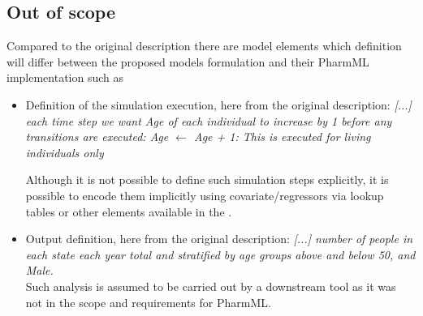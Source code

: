 \subsection*{Out of scope}
Compared to the original description there are model elements which 
definition will differ between the proposed models formulation and their  
PharmML implementation such as
\begin{itemize}
\item 
Definition of the simulation execution, here from the original description: \emph{ [...] each time 
step we want Age of each individual to increase by 1 before any transitions 
are executed: Age $\leftarrow$ Age + 1: This is executed for living individuals only}

Although it is not possible to define such simulation steps explicitly, it
is possible to encode them implicitly using covariate/regressors via lookup 
tables or other elements available in the . 
\item 
Output definition, here from the original description: \emph{[...] number of people in each 
state each year total and stratified by age groups above and below 50, and Male.} \\
Such analysis is assumed to be carried out by a downstream tool as it was 
not in the scope and requirements for PharmML.
\end{itemize}


